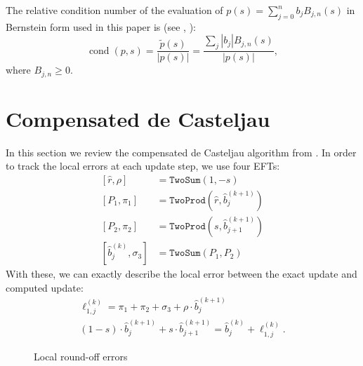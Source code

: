 \documentclass[letterpaper,10pt]{article}
\theoremstyle{definition}
\newcommand{\cond}[1]{\operatorname{cond}\left(#1\right)}
\begin{document}
The relative condition number of the evaluation of \(p(s) = \sum_{j = 0}^n
b_j B_{j, n}(s)\) in Bernstein form used in this paper is (see
\cite{Mainar1999}, \cite{Farouki1987}):
\begin{equation}
\cond{p, s} = \frac{\widetilde{p}\left(s\right)}{
  \left|p(s)\right|} = \frac{\sum_j \left|b_j\right| B_{j, n}(s)}{
  \left|p(s)\right|},
\end{equation}
where \(B_{j, n} \geq 0\).

\section{Compensated de Casteljau}\label{sec:compensated-2}

In this section we review the compensated de Casteljau algorithm
from \cite{Jiang2010}. In order to track the local errors at
each update step, we use four EFTs:
\begin{align}
\left[\widehat{r}, \rho\right] &= \mathtt{TwoSum}(1, -s) \\
\left[P_1, \pi_1\right] &= \mathtt{TwoProd}\left(
    \widehat{r}, \widehat{b}_j^{(k + 1)}\right) \\
\left[P_2, \pi_2\right] &= \mathtt{TwoProd}\left(
    s, \widehat{b}_{j + 1}^{(k + 1)}\right) \\
\left[\widehat{b}_j^{(k)}, \sigma_3\right] &= \mathtt{TwoSum}(P_1, P_2)
\end{align}
With these, we can exactly describe the local error between the exact
update and computed update:
\begin{gather}
\ell_{1, j}^{(k)} = \pi_1 + \pi_2 + \sigma_3 + \rho \cdot
  \widehat{b}_j^{(k + 1)} \label{ell-j} \\
(1 - s) \cdot \widehat{b}_j^{(k + 1)} +
  s \cdot \widehat{b}_{j + 1}^{(k + 1)} =
\widehat{b}_j^{(k)} + \ell_{1, j}^{(k)}.
\end{gather}

\begin{figure}
\centering
{}
\captionsetup{width=.75\linewidth}
\caption{Local round-off errors}
\label{fig:loc-err-accumulate}
\end{figure}
\end{document}
